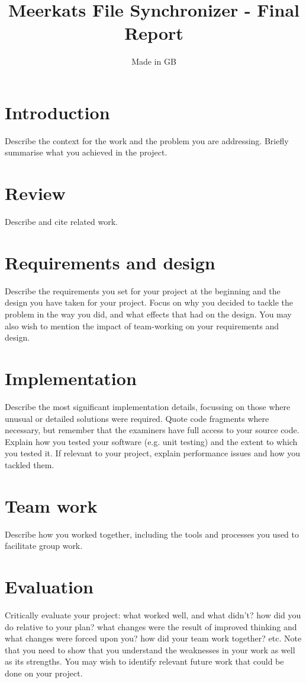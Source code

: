 \documentclass{article}
\title{Meerkats File Synchronizer - Final Report}
\author{Made in GB}
\date{}
\begin{document}
\maketitle{}

\section{Introduction}
Describe the context for the work and the problem you are addressing. Briefly summarise what you achieved in the project.

\section{Review}
Describe and cite related work.

\section{Requirements and design}
Describe the requirements you set for your project at the beginning and the design you have taken for your project. Focus on why you decided to tackle the problem in the way you did, and what effects that had on the design. You may also wish to mention the impact of team-working on your requirements and design.

\section{Implementation}
Describe the most significant implementation details, focussing on those where unusual or detailed solutions were required. Quote code fragments where necessary, but remember that the examiners have full access to your source code. Explain how you tested your software (e.g. unit testing) and the extent to which you tested it. If relevant to your project, explain performance issues and how you tackled them.

\section{Team work}
Describe how you worked together, including the tools and processes you used to facilitate group work.

\section{Evaluation}
Critically evaluate your project: what worked well, and what didn’t? how did you do relative to your plan? what changes were the result of improved thinking and what changes were forced upon you? how did your team work together? etc. Note that you need to show that you understand the weaknesses in your work as well as its strengths. You may wish to identify relevant future work that could be done on your project.
\end{document}
